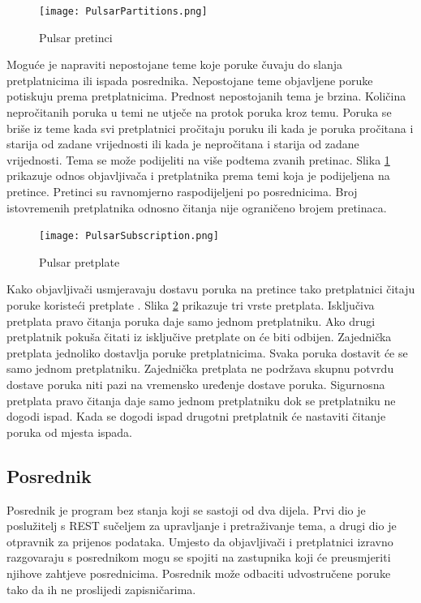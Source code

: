 \documentclass[utf8, diplomski, lmodern, numeric]{fer}
\begin{document}
\begin{figure}[H]
    \centering
    \texttt{[image: PulsarPartitions.png]}
    \caption{Pulsar pretinci}
    \label{fig:pulsar-partitions}
\end{figure}

Moguće je napraviti nepostojane teme  koje poruke čuvaju do slanja pretplatnicima ili ispada posrednika. Nepostojane teme objavljene poruke potiskuju prema pretplatnicima. Prednost nepostojanih tema je brzina. Količina nepročitanih poruka u temi ne utječe na protok poruka kroz temu. Poruka se briše iz teme kada svi pretplatnici pročitaju poruku ili kada je poruka pročitana i starija od zadane vrijednosti ili kada je nepročitana i starija od zadane vrijednosti. Tema se može podijeliti na više podtema zvanih pretinac. Slika \ref{fig:pulsar-partitions} prikazuje odnos objavljivača i pretplatnika prema temi koja je podijeljena na pretince. Pretinci su ravnomjerno raspodijeljeni po posrednicima. Broj istovremenih pretplatnika odnosno čitanja nije ograničeno brojem pretinaca.

\begin{figure}[H]
    \centering
    \texttt{[image: PulsarSubscription.png]}
    \caption{Pulsar pretplate}
    \label{fig:pulsar-subscription}
\end{figure}

Kako objavljivači usmjeravaju dostavu poruka na pretince tako pretplatnici čitaju poruke koristeći pretplate . Slika \ref{fig:pulsar-subscription} prikazuje tri vrste pretplata. Isključiva pretplata  pravo čitanja poruka daje samo jednom pretplatniku. Ako drugi pretplatnik pokuša čitati iz isključive pretplate on će biti odbijen. Zajednička pretplata  jednoliko dostavlja poruke pretplatnicima. Svaka poruka dostavit će se samo jednom pretplatniku. Zajednička pretplata ne podržava skupnu potvrdu dostave poruka niti pazi na vremensko uređenje dostave poruka. Sigurnosna pretplata  pravo čitanja daje samo jednom pretplatniku dok se pretplatniku ne dogodi ispad. Kada se dogodi ispad drugotni pretplatnik će nastaviti čitanje poruka od mjesta ispada.

\subsection{Posrednik}

Posrednik je program bez stanja koji se sastoji od dva dijela. Prvi dio je poslužitelj s REST sučeljem za upravljanje i pretraživanje tema, a drugi dio je otpravnik  za prijenos podataka. Umjesto da objavljivači i pretplatnici izravno razgovaraju s posrednikom mogu se spojiti na zastupnika  koji će preusmjeriti njihove zahtjeve posrednicima. Posrednik može odbaciti udvostručene poruke tako da ih ne proslijedi zapisničarima.
\end{document}
